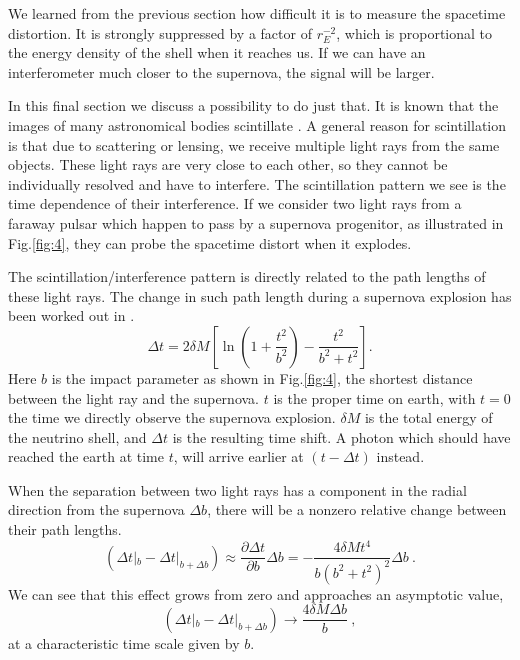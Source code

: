 \documentclass[aps,showpacs,twocolumn,floats,prd,superscriptaddress,nofootinbib]{revtex4-1}
\begin{document}
\twocolumngrid

We learned from the previous section how difficult it is to measure the spacetime distortion. It is strongly suppressed by a factor of $r_E^{-2}$, which is proportional to the energy density of the shell when it reaches us. If we can have an interferometer much closer to the supernova, the signal will be larger.

In this final section we discuss a possibility to do just that. It is known that the images of many astronomical bodies scintillate \cite{PulsarScint}. A general reason for scintillation is that due to scattering or lensing, we receive multiple light rays from the same objects. These light rays are very close to each other, so they cannot be individually resolved and have to interfere. The scintillation pattern we see is the time dependence of their interference. If we consider two light rays from a faraway pulsar which happen to pass by a supernova progenitor, as illustrated in Fig.\ref{fig:4}, they can probe the spacetime distort when it explodes. 

The scintillation/interference pattern is directly related to the path lengths of these light rays. The change in such path length during a supernova explosion has been worked out in \cite{Olum:2013gza}. 
\begin{equation}
	\Delta t = 2\delta M \left[ \ln \left(1 + \frac{t^2}{b^2} \right) - \frac{t^2}{b^2 + t^2} \right].
\end{equation}
Here $b$ is the impact parameter as shown in Fig.\ref{fig:4}, the shortest distance between the light ray and the supernova. $t$ is the proper time on earth, with $t=0$ the time we directly observe the supernova explosion. $\delta M$ is the total energy of the neutrino shell, and $\Delta t$ is the resulting time shift. A photon which should have reached the earth at time $t$, will arrive earlier at $(t-\Delta t)$ instead.

When the separation between two light rays has a component in the radial direction from the supernova $\Delta b$, there will be a nonzero relative change between their path lengths.
\begin{equation}
	(\Delta t|_b - \Delta t|_{b+\Delta b}) \approx 
	\frac{\partial \Delta t}{\partial b} \Delta b 
	= - \frac{4\delta Mt^4}{b(b^2 + t^2)^2} \Delta b~.
	\label{eq-change}
\end{equation}
We can see that this effect grows from zero and approaches an asymptotic value,\begin{equation}
	(\Delta t|_b - \Delta t|_{b+\Delta b}) 
	\longrightarrow \frac{4\delta M \Delta b}{b}~,
\end{equation}
at a characteristic time scale given by $b$. 
\end{document}
